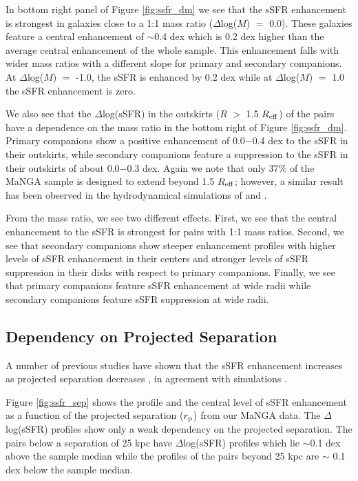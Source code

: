\documentclass[apj,twocolumn]{emulateapj}
\newcommand{\reff}{$R_{\rm eff}$}
\begin{document}
\begin{CJK*}{UTF8}{gbsn}
In bottom right panel of Figure \ref{fig:ssfr_dm} we see that the sSFR enhancement is strongest in galaxies close to a 1:1 mass ratio ($\Delta$log($M$) $=$ 0.0). These galaxies feature a central enhancement of $\sim$0.4 dex which is 0.2 dex higher than the average central enhancement of the whole sample. This enhancement falls with wider mass ratios with a different slope for primary and secondary companions. At $\Delta$log($M$) $=$ -1.0, the sSFR is enhanced by 0.2 dex while at $\Delta$log($M$) $=$ 1.0 the sSFR enhancement is zero.

We also see that the $\Delta$log(sSFR) in the outskirts ($R$ $>$ 1.5 \reff) of the pairs have a dependence on the mass ratio in the bottom right of Figure \ref{fig:ssfr_dm}. Primary companions show a positive enhancement of 0.0$-$0.4 dex to the sSFR in their outskirts, while secondary companions feature a suppression to the sSFR in their outskirts of about 0.0$-$0.3 dex. Again we note that only 37\% of the MaNGA sample is designed to extend beyond 1.5 \reff; however, a similar result has been observed in the hydrodynamical simulations of \citet{Moreno:2015} and \citet{Moreno:2020}. 

From the mass ratio, we see two different effects. First, we see that the central enhancement to the sSFR is strongest for pairs with 1:1 mass ratios. Second, we see that secondary companions show steeper enhancement profiles with higher levels of sSFR enhancement in their centers and stronger levels of sSFR suppression in their disks with respect to primary companions. Finally, we see that primary companions feature sSFR enhancement at wide radii while secondary companions feature sSFR suppression at wide radii.

\subsection{Dependency on Projected Separation}\label{sec:sep}

A number of previous studies have shown that the sSFR enhancement increases as projected separation decreases \citep[e.g.,][]{Li:2008, Ellison:2008, Scudder:2012, Patton:2013}, in agreement with simulations \citep{Scudder:2012}. 

Figure \ref{fig:ssfr_sep} shows the profile and the central level of sSFR enhancement as a function of the projected separation ($r_{\rm p}$) from our MaNGA data. The $\Delta$log(sSFR) profiles show only a weak dependency on the projected separation. The pairs below a separation of 25 kpc have $\Delta$log(sSFR) profiles which lie $\sim$0.1 dex above the sample median while the profiles of the pairs beyond 25 kpc are $\sim$ 0.1 dex below the sample median. 


\end{CJK*}
\end{document}
